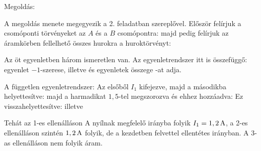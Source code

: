 
\ifdefined\megoldas
 
 Megoldás: 

 A megoldás menete megegyezik a 2. feladatban szereplővel. Először felírjuk a csomóponti törvényeket az $A$ és a $B$ csomópontra:
 majd pedig felírjuk az áramkörben fellelhető összes hurokra a huroktörvényt:

 Az öt egyenletben három ismeretlen van. Az egyenletrendszer itt is összefüggő:  egyenlet  $-1$-szerese, illetve  és  egyenletek összege -at adja.

 A független egyenletrendszer:
 Az elsőből $I_1$ kifejezve, majd a másodikba helyettesítve:
 majd a harmadikat $1,5$-tel megszorozva és ehhez hozzáadva:
 Ez visszahelyettesítve:
 illetve

 Tehát az 1-es ellenálláson A nyílnak megfelelő irányba folyik $I_1=1,2\mathrm{\, A}$, a 2-es ellenálláson szintén $1,2\mathrm{\, A}$ folyik, de a kezdetben felvettel ellentétes irányban. A 3-as ellenálláson nem folyik áram. 

\fi